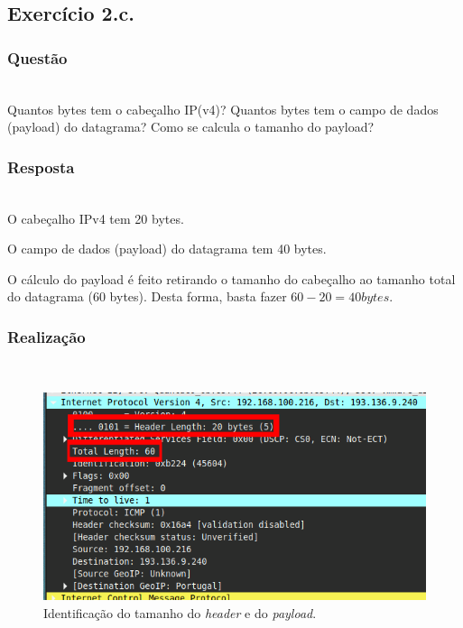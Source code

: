 \documentclass{llncs}
\begin{document}

\subsection{Exercício 2.c.}
\subsubsection{Questão}\rule[-10pt]{0pt}{10pt}\\

Quantos bytes tem o cabeçalho IP(v4)? Quantos bytes tem o campo de dados (payload) do datagrama? Como se calcula o tamanho do payload?  

\subsubsection{Resposta}\rule[-10pt]{0pt}{10pt}\\
	
O cabeçalho IPv4 tem 20 bytes.

O campo de dados (payload) do datagrama tem 40 bytes.

O cálculo do payload é feito retirando o tamanho do cabeçalho ao tamanho total do datagrama (60 bytes). Desta forma, basta fazer \(60 - 20 = 40 bytes\).

\subsubsection{Realização}\rule[-10pt]{0pt}{10pt}\\
\begin{figure}
	\begin{center}
	\includegraphics[scale=0.35]{./imagens/icmp_size.png} 
	\end{center}
	\caption{\label{fig:icmp_size}Identificação do tamanho do \textit{header} e do \textit{payload}.}
\end{figure} 
\end{document}
